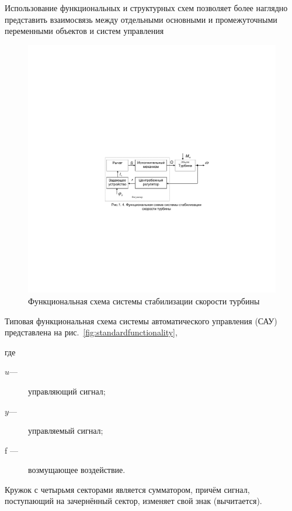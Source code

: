 Использование функциональных и структурных схем позволяет более наглядно представить взаимосвязь между отдельными основными и промежуточными переменными объектов и систем управления

\begin{figure}[h!]
	\centering
	\includegraphics[scale=0.95]{images/FunctionStabilization}
	\caption{Функциональная схема системы стабилизации скорости турбины}
	\label{fig:functionstabilization}
\end{figure}

Типовая функциональная схема системы автоматического управления (САУ) представлена на рис.~\ref{fig:standardfunctionality},

где \begin{description}
		\item[$ u $---] управляющий сигнал;
		\item[$ y $---] управляемый сигнал;
		\item[f ---] возмущающее воздействие.
\end{description}

Кружок с четырьмя секторами является сумматором, причём сигнал, поступающий на зачернённый сектор, изменяет свой знак (вычитается).

